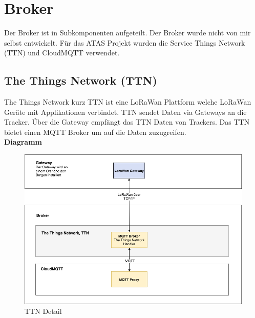 \documentclass[11pt,english,german]{report}
\theoremstyle{definition}
\begin{document}
\newpage
\section{Broker}
Der Broker ist in Subkomponenten aufgeteilt. Der Broker wurde nicht von mir selbst entwickelt. Für das ATAS Projekt wurden die Service Things Network (TTN) und CloudMQTT verwendet.

\subsection{The Things Network (TTN)}
The Things Network kurz TTN ist eine LoRaWan Plattform welche LoRaWan Geräte mit Applikationen verbindet. TTN sendet Daten via Gateways an die Tracker. Über die Gateway empfängt das TTN Daten von Trackers. Das TTN bietet einen MQTT Broker um auf die Daten zuzugreifen.\\[0.3cm]
\textbf{Diagramm}
\begin{figure}[H]
	\centering
	\includegraphics[width=\textwidth]{img/system/ATAS_SystemOverview_TTN_BA.png}
	\caption[TTN Detail]
	{TTN Detail}
\end{figure}

\newpage
\end{document}
